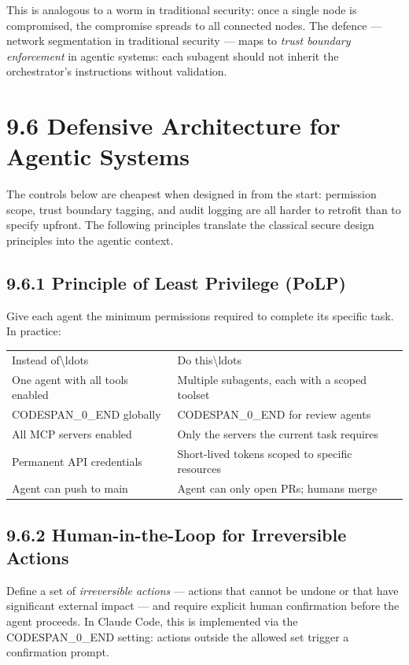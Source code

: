 \documentclass[11pt,a4paper]{book}
\begin{document}
This is analogous to a worm in traditional security: once a single node is compromised, the compromise spreads to all connected nodes. The defence --- network segmentation in traditional security --- maps to \textit{trust boundary enforcement} in agentic systems: each subagent should not inherit the orchestrator's instructions without validation.

\medskip

\section{9.6 Defensive Architecture for Agentic Systems}

The controls below are cheapest when designed in from the start: permission scope, trust boundary tagging, and audit logging are all harder to retrofit than to specify upfront. The following principles translate the classical secure design principles into the agentic context.

\subsection{9.6.1 Principle of Least Privilege (PoLP)}

Give each agent the minimum permissions required to complete its specific task. In practice:

\begin{tabular}{ll}
\hline
Instead of\textbackslash{}ldots{} & Do this\textbackslash{}ldots{} \\
One agent with all tools enabled & Multiple subagents, each with a scoped toolset \\
CODESPAN\_0\_END globally & CODESPAN\_0\_END for review agents \\
All MCP servers enabled & Only the servers the current task requires \\
Permanent API credentials & Short-lived tokens scoped to specific resources \\
Agent can push to main & Agent can only open PRs; humans merge \\
\hline
\end{tabular}

\subsection{9.6.2 Human-in-the-Loop for Irreversible Actions}

Define a set of \textit{irreversible actions} --- actions that cannot be undone or that have significant external impact --- and require explicit human confirmation before the agent proceeds. In Claude Code, this is implemented via the CODESPAN\_0\_END setting: actions outside the allowed set trigger a confirmation prompt.
\end{document}

